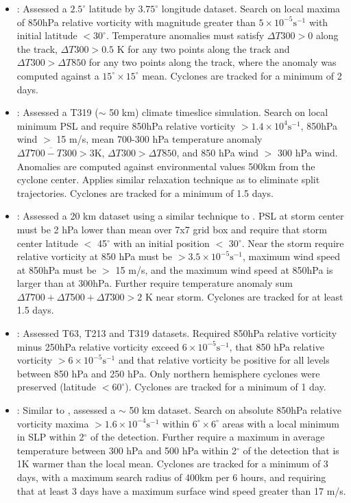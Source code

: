 \documentclass[gmdd, hvmath, online]{copernicus_discussions}
\begin{document}
\begin{itemize}
\item \cite{mcdonald2005tropical}:  Assessed a $2.5^\circ$ latitude by $3.75^\circ$ longitude dataset.  Search on local maxima of 850hPa relative vorticity with magnitude greater than $5 \times 10^{-5} \mbox{s}^{-1}$ with initial latitude $< 30^\circ$.  Temperature anomalies must satisfy $\Delta T300 > 0$ along the track, $\Delta T300 > 0.5$ K for any two points along the track and $\Delta T300 > \Delta T850$ for any two points along the track, where the anomaly was computed against a $15^\circ \times 15^\circ$ mean.  Cyclones are tracked for a minimum of 2 days.

\item \cite{chauvin2006vortices}:  Assessed a T319 ($\sim$ 50 km) climate timeslice simulation. Search on local minimum PSL and require 850hPa relative vorticity $> 1.4 \times 10^{4} \mbox{s}^{-1}$, 850hPa wind $>$ 15 m/s, mean 700-300 hPa temperature anomaly $\Delta \overline{T700-T300} > 3 \mbox{K}$, $\Delta T300 > \Delta T850$, and 850 hPa wind $>$ 300 hPa wind. Anomalies are computed against environmental values 500km from the cyclone center. Applies similar relaxation technique as \citet{camargo2002improving} to eliminate split trajectories. Cyclones are tracked for a minimum of 1.5 days.

\item \cite{oouchi2006tropical}:  Assessed a 20 km dataset using a similar technique to \cite{sugi2002influence}.  PSL at storm center must be 2 hPa lower than mean over 7x7 grid box and require that storm center latitude $<$ 45$^\circ$ with an initial position $<$ 30$^\circ$.  Near the storm require relative vorticity at 850 hPa must be $> 3.5 \times 10^{-5} \mbox{s}^{-1}$, maximum wind speed at 850hPa must be $>$ 15 m/s, and the maximum wind speed at 850hPa is larger than at 300hPa.  Further require temperature anomaly sum $\Delta T700+ \Delta T500+ \Delta T300 > 2$ K near storm.  Cyclones are tracked for at least 1.5 days.

\item \cite{bengtsson2007how}:  Assessed T63, T213 and T319 datasets.  Required 850hPa relative vorticity minus 250hPa relative vorticity exceed $6 \times 10^{-5} \mbox{s}^{-1}$, that 850 hPa relative vorticity $> 6 \times 10^{-5} \mbox{s}^{-1}$ and that relative vorticity be positive for all levels between 850 hPa and 250 hPa.  Only northern hemisphere cyclones were preserved (latitude $< 60^\circ$).  Cyclones are tracked for a minimum of 1 day.

\item \cite{knutson2007simulation, zhao2009simulations}:  Similar to \citet{vitart1997simulation, vitart2003mozambique}, assessed a $\sim$ 50 km dataset.  Search on absolute 850hPa relative vorticity maxima $> 1.6 \times 10^{-4} \mbox{s}^{-1}$ within $6^\circ \times 6^\circ$ areas with a local minimum in SLP within 2$^\circ$ of the detection.  Further require a maximum in average temperature between 300 hPa and 500 hPa within 2$^\circ$ of the detection that is 1K warmer than the local mean.  Cyclones are tracked for a minimum of 3 days, with a maximum search radius of 400km per 6 hours, and requiring that at least 3 days have a maximum surface wind speed greater than 17 m/s.


\end{itemize}
\end{document}
